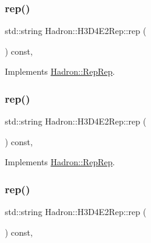 \subsubsection{\texorpdfstring{rep()}{rep()}\hspace{0.1cm}{\footnotesize\ttfamily [2/5]}}
{\footnotesize\ttfamily std\+::string Hadron\+::\+H3\+D4\+E2\+Rep\+::rep (\begin{DoxyParamCaption}{ }\end{DoxyParamCaption}) const\hspace{0.3cm}{\ttfamily [inline]}, {\ttfamily [virtual]}}



Implements \mbox{\hyperlink{structHadron_1_1RepRep_ab3213025f6de249f7095892109575fde}{Hadron\+::\+Rep\+Rep}}.

\mbox{\label{structHadron_1_1H3D4E2Rep_ab0cffc17ffd30d135328751bad30c549}} 
\subsubsection{\texorpdfstring{rep()}{rep()}\hspace{0.1cm}{\footnotesize\ttfamily [3/5]}}
{\footnotesize\ttfamily std\+::string Hadron\+::\+H3\+D4\+E2\+Rep\+::rep (\begin{DoxyParamCaption}{ }\end{DoxyParamCaption}) const\hspace{0.3cm}{\ttfamily [inline]}, {\ttfamily [virtual]}}



Implements \mbox{\hyperlink{structHadron_1_1RepRep_ab3213025f6de249f7095892109575fde}{Hadron\+::\+Rep\+Rep}}.

\mbox{\label{structHadron_1_1H3D4E2Rep_ab0cffc17ffd30d135328751bad30c549}} 
\subsubsection{\texorpdfstring{rep()}{rep()}\hspace{0.1cm}{\footnotesize\ttfamily [4/5]}}
{\footnotesize\ttfamily std\+::string Hadron\+::\+H3\+D4\+E2\+Rep\+::rep (\begin{DoxyParamCaption}{ }\end{DoxyParamCaption}) const\hspace{0.3cm}{\ttfamily [inline]}, {\ttfamily [virtual]}}



